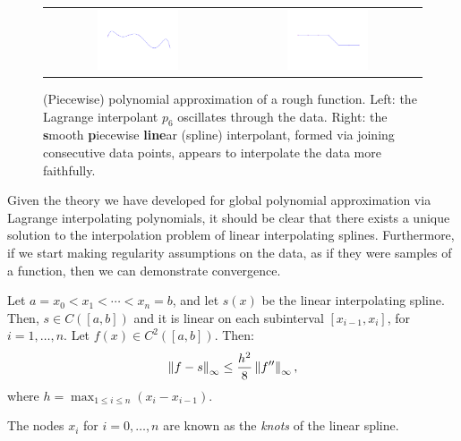 \begin{figure}[htbp]
\begin{center}
\begin{tabular}{cc}
\hspace*{-0.5cm}\includegraphics[width=0.45\textwidth]{spline1a}&
\hspace*{-0.5cm}\includegraphics[width=0.45\textwidth]{spline1b}\\
\end{tabular}
\vspace*{-1cm}
\caption{(Piecewise) polynomial approximation of a rough function. Left: the Lagrange interpolant $p_6$ oscillates through the data. Right: the {\bf s}mooth {\bf p}iecewise {\bf line}ar (spline) interpolant, formed via joining consecutive data points, appears to interpolate the data more faithfully.}
\label{figure:SplineIntro}
\end{center}
\end{figure}

Given the theory we have developed for global polynomial approximation via Lagrange interpolating polynomials, it should be clear that there exists a unique solution to the interpolation problem of linear interpolating splines. Furthermore, if we start making regularity assumptions on the data, as if they were samples of a function, then we can demonstrate convergence.

\begin{theorem}\label{theorem:LinearSplineConvergence}
Let $a=x_0<x_1<\cdots<x_n=b$, and let $s(x)$ be the linear interpolating spline. Then, $s\in C([a,b])$ and it is linear on each subinterval $[x_{i-1},x_i]$, for $i=1,\ldots,n$. Let $f(x)\in C^2([a,b])$. Then:
\[
\left\|{f-s}\right\|_\infty \le \dfrac{h^2}{8}\left\|{f''}\right\|_\infty,
\]
where $\displaystyle h=\max_{1\le i\le n}(x_i-x_{i-1})$.
\end{theorem}
The nodes $x_i$ for $i=0,\ldots,n$ are known as the {\em knots} of the linear spline.

